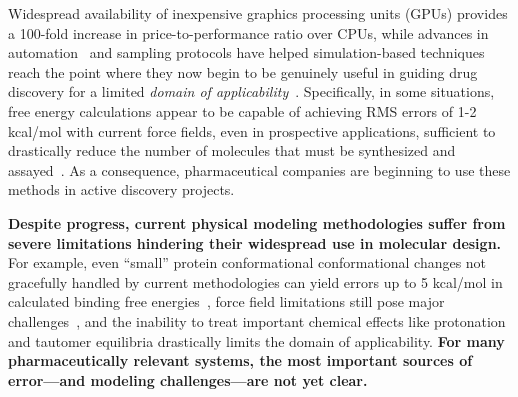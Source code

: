 \documentclass[11pt]{article}
\begin{document}
Widespread availability of inexpensive graphics processing units (GPUs) provides a 100-fold increase in price-to-performance ratio over CPUs, while advances in automation~\cite{liu_lead_2013} and sampling protocols have helped simulation-based techniques reach the point where they now begin to be genuinely useful in guiding drug discovery for a limited \emph{domain of applicability}~\cite{mikulskis_large-scale_2014, homeyer_binding_2014, sherborne_preprint_2016,  schrodinger_accurate_2015, christ_binding_2016, cui_affinity_2016, verras_free_2016}.
Specifically, in some situations, free energy calculations appear to be capable of achieving RMS errors of 1-2 kcal/mol with current force fields, even in prospective applications, sufficient to drastically reduce the number of molecules that must be synthesized and assayed~\cite{shirts_free-energy_2010}.
As a consequence, pharmaceutical companies are beginning to use these methods in active discovery projects.

\textbf{Despite progress, current physical modeling methodologies suffer from severe limitations hindering their widespread use in molecular design.}
For example, even ``small'' protein conformational conformational changes not gracefully handled by current methodologies can yield errors up to 5 kcal/mol in calculated binding free energies~\cite{lim_sensitivity_2016}, force field limitations still pose major challenges~\cite{rocklin_blind_2013}, and the inability to treat important chemical effects like protonation and tautomer equilibria drastically limits the domain of applicability.
{\bf For many pharmaceutically relevant systems, the most important sources of error---and modeling challenges---are not yet clear.}
\end{document}
